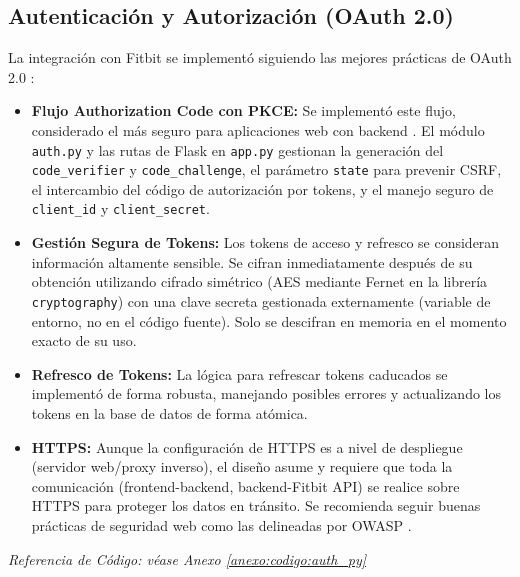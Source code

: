 \subsection{Autenticación y Autorización (OAuth 2.0)}
La integración con Fitbit se implementó siguiendo las mejores prácticas de OAuth 2.0 \citep{oauth_spec_rfc6749}:
\begin{itemize}
    \item \textbf{Flujo Authorization Code con PKCE:} Se implementó este flujo, considerado el más seguro para aplicaciones web con backend \citep{oauth_security_bcp_rfc8252}. El módulo \texttt{auth.py} y las rutas de Flask en \texttt{app.py} gestionan la generación del \texttt{code\_verifier} y \texttt{code\_challenge}, el parámetro \texttt{state} para prevenir CSRF, el intercambio del código de autorización por tokens, y el manejo seguro de \texttt{client\_id} y \texttt{client\_secret}.
    \item \textbf{Gestión Segura de Tokens:} Los tokens de acceso y refresco se consideran información altamente sensible. Se cifran inmediatamente después de su obtención utilizando cifrado simétrico (AES mediante Fernet en la librería \texttt{cryptography}) con una clave secreta gestionada externamente (variable de entorno, no en el código fuente). Solo se descifran en memoria en el momento exacto de su uso.
    \item \textbf{Refresco de Tokens:} La lógica para refrescar tokens caducados se implementó de forma robusta, manejando posibles errores y actualizando los tokens en la base de datos de forma atómica.
    \item \textbf{HTTPS:} Aunque la configuración de HTTPS es a nivel de despliegue (servidor web/proxy inverso), el diseño asume y requiere que toda la comunicación (frontend-backend, backend-Fitbit API) se realice sobre HTTPS para proteger los datos en tránsito. Se recomienda seguir buenas prácticas de seguridad web como las delineadas por OWASP \citep{owasp_top10}.
\end{itemize}
\noindent\textit{Referencia de Código: véase Anexo \ref{anexo:codigo:auth_py}}
